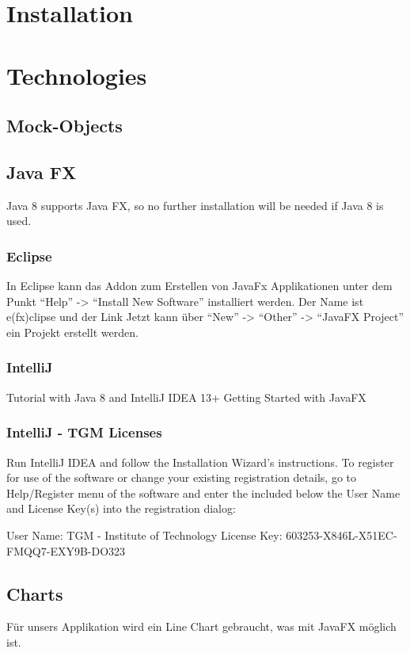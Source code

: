 \documentclass[11pt, a4paper]{article}
\begin{document}
\section{Installation}

\section{Technologies}
\subsection{Mock-Objects}
\subsection{Java FX}
Java 8 supports Java FX, so no further installation will be needed if Java 8 is used. 

\subsubsection{Eclipse}
In Eclipse kann das Addon zum Erstellen von JavaFx Applikationen unter dem Punkt “Help” -> “Install New Software” installiert werden. Der Name ist e(fx)clipse und der Link %
Jetzt kann über “New” -> “Other” -> “JavaFX Project” ein Projekt erstellt werden. 

\subsubsection{IntelliJ}
Tutorial with Java 8 and IntelliJ IDEA 13+
Getting Started with JavaFX

\subsubsection{IntelliJ - TGM Licenses}
Run IntelliJ IDEA and follow the Installation Wizard's instructions. To register for use of the software or change your existing registration details, go to Help/Register menu of the software and enter the included below the User Name and License Key(s) into the registration dialog:

User Name: TGM - Institute of Technology 
License Key: 603253-X846L-X51EC-FMQQ7-EXY9B-DO323

\subsection{Charts}
Für unsers Applikation wird ein Line Chart gebraucht, was mit JavaFX möglich ist. 
\end{document}
